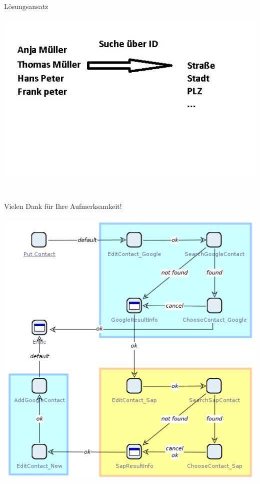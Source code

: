 \documentclass[xcolor={usenames,dvipsnames}, compress, 10pt]{beamer}
\begin{document}
\subsection*{}

\begin{frame}{Lösungsansatz}
\begin{center}


\includegraphics[width=\textheight]{Bilder/presi2.jpg} 

\end{center}
\end{frame}






\section*{}
\begin{frame}{Vielen Dank f\"ur Ihre Aufmerksamkeit!}
\begin{center}
\includegraphics[height=0.8\textheight]{Bilder/jabc_Model.png} 
\end{center}
\end{frame}
\end{document}
